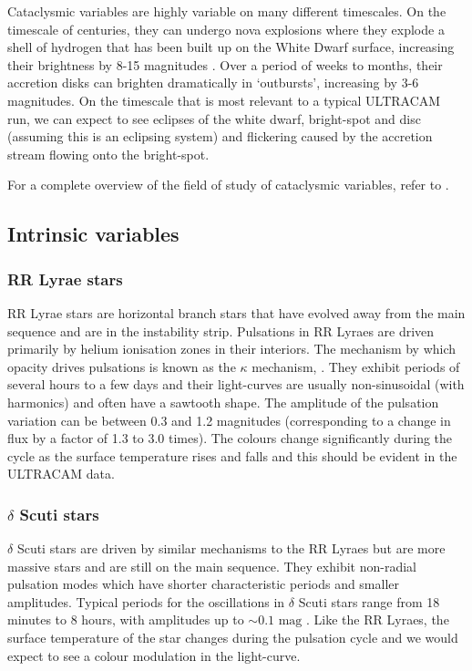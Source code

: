 Cataclysmic variables are highly variable on many different timescales. On the timescale of centuries, they can undergo nova explosions where they explode a shell of hydrogen that has been built up on the White Dwarf surface, increasing their brightness by 8-15 magnitudes \citep{HellierBook}. Over a period of weeks to months, their accretion disks can brighten dramatically in `outbursts', increasing by 3-6 magnitudes. On the timescale that is most relevant to a typical ULTRACAM run, we can expect to see eclipses of the white dwarf, bright-spot and disc (assuming this is an eclipsing system) and flickering caused by the accretion stream flowing onto the bright-spot. 

For a complete overview of the field of study of cataclysmic variables, refer to \citet{WarnerBook}. 

\subsection{Intrinsic variables}

\subsubsection{RR Lyrae stars}
RR Lyrae stars are horizontal branch stars that have evolved away from the main sequence and are in the instability strip. Pulsations in RR Lyraes are driven primarily by helium ionisation zones in their interiors. The mechanism by which opacity drives pulsations is known as the $\kappa$ mechanism, \citep{asteroseismology}. They exhibit periods of several hours to a few days and their light-curves are usually non-sinusoidal (with harmonics) and often have a sawtooth shape. The amplitude of the pulsation variation can be between 0.3 and 1.2 magnitudes (corresponding to a change in flux by a factor of 1.3 to 3.0 times). The colours change significantly during the cycle as the surface temperature rises and falls and this should be evident in the ULTRACAM data. 

\subsubsection{$\delta$ Scuti stars}
$\delta$ Scuti stars are driven by similar mechanisms to the RR Lyraes but are more massive stars and are still on the main sequence. They exhibit non-radial pulsation modes which have shorter characteristic periods and smaller amplitudes. Typical periods for the oscillations in $\delta$ Scuti stars range from 18 minutes to 8 hours, with amplitudes up to $\sim \mbox{0.1 mag}$ \citep{KurtzBook}. Like the RR Lyraes, the surface temperature of the star changes during the pulsation cycle and we would expect to see a colour modulation in the light-curve. 

